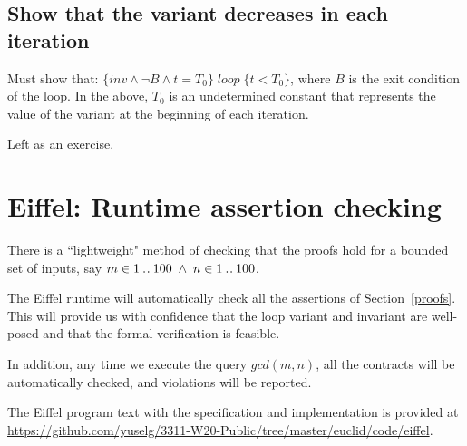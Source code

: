 \documentclass[runningheads,12pt]{article}
\begin{document}
\subsection{Show that the variant decreases in each iteration}

Must show that: $\{inv \land \lnot B \land t = T_0\}\; loop \;\{t < T_0\}$, where $B$ is the exit condition of the loop. In the above, $T_0$ is an undetermined constant that represents the value of the variant at the beginning of each iteration. 

Left as an exercise.

\section{Eiffel: Runtime assertion checking}
There is a ``lightweight" method of checking that the proofs hold for a bounded set of inputs, say $m \in 1\mathbin{.\mkern1mu.} 100 \; \land \; n \in 1\mathbin{.\mkern1mu.} 100$. 

The Eiffel runtime will automatically check all the assertions of Section~\ref{proofs}. This will provide us with confidence that the loop variant and invariant are well-posed and that the formal verification is feasible.

In addition, any time we execute the query $gcd(m,n)$, all the contracts will be automatically checked, and violations will be reported. 

The Eiffel program text with the specification and  implementation is provided at \url{https://github.com/yuselg/3311-W20-Public/tree/master/euclid/code/eiffel}. 




\end{document}

